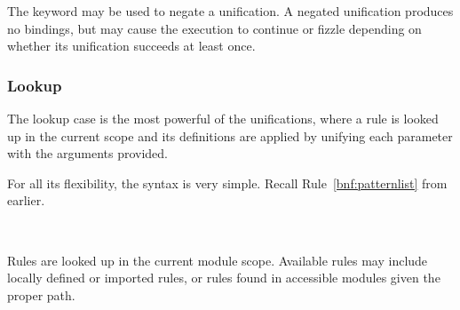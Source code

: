 The keyword  may be used to negate a unification. A negated unification
produces no bindings, but may cause the execution to continue or fizzle
depending on whether its unification succeeds at least once.

\begin{figure}[H]
    \centering
    \parbox[t]{0.45\linewidth}{
        \begin{prooftree}
        \end{prooftree}
    }
    \parbox[t]{0.45\linewidth}{
        \begin{prooftree}
        \end{prooftree}
    }
\end{figure}

\subsubsection{Lookup}

The lookup case is the most powerful of the unifications, where a rule is looked up
in the current scope and its definitions are applied by unifying each parameter with
the arguments provided.

For all its flexibility, the syntax is very simple. Recall Rule~\ref{bnf:patternlist}
from earlier.

\begin{bnf*}
     \\
\end{bnf*}

Rules are looked up in the current module scope. Available rules may include locally
defined or imported rules, or rules found in accessible modules given the proper path.

\begin{prooftree}
\end{prooftree}

